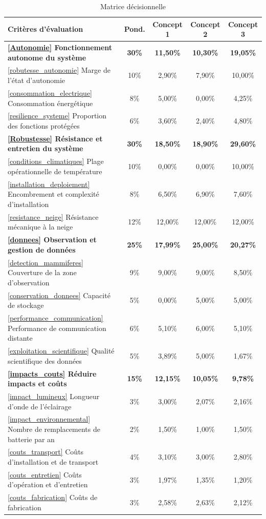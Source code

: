 \begin{table}[H]
\centering
\caption{Matrice décisionnelle}
\label{tab:matricede}
\small
\begin{tabular}{|l|c||c|c|c|}
\hline
Critères d'évaluation & Pond. & Concept 1 & Concept 2 & Concept 3 \\
\hline\hline
\textbf{\ref{Autonomie} Fonctionnement autonome du système} & \textbf{30\%} & \textbf{11,50\%} & \textbf{10,30\%} & \textbf{19,05\%}  \\
\hline
\ref{robutesse_autonomie} Marge de l'état d'autonomie & 10\% & 2,90\% & 7,90\% & 10,00\% \\
\ref{consommation_electrique} Consommation énergétique & 8\% & 5,00\% & 0,00\% & 4,25\% \\
\ref{resilience_systeme} Proportion des fonctions protégées & 6\% & 3,60\% & 2,40\% & 4,80\% \\
\hline

\textbf{\ref{Robustesse} Résistance et entretien du système} & \textbf{30\%} & \textbf{18,50\%} & \textbf{18,90\%} & \textbf{29,60\%}  \\
\hline
\ref{conditions_climatiques} Plage opérationnelle de température & 10\% & 0,00\% & 0,00\% & 10,00\% \\
\ref{installation_deploiement} Encombrement et complexité d'installation & 8\% & 6,50\% & 6,90\% & 7,60\% \\
\ref{resistance_neige} Résistance mécanique à la neige & 12\% & 12,00\% & 12,00\% & 12,00\% \\
\hline

\textbf{\ref{donnees} Observation et gestion de données} & \textbf{25\%} & \textbf{17,99\%} & \textbf{25,00\%} & \textbf{20,27\%}  \\
\hline
\ref{detection_mammiferes} Couverture de la zone d'observation & 9\% & 9,00\% & 9,00\% & 8,50\% \\
\ref{conservation_donnees} Capacité de stockage & 5\% & 0,00\% & 5,00\% & 5,00\% \\
\ref{performance_communication} Performance de communication distante & 6\% & 5,10\% & 6,00\% & 5,10\% \\
\ref{exploitation_scientifique} Qualité scientifique des données & 5\% & 3,89\% & 5,00\% & 1,67\% \\
\hline

\textbf{\ref{impacts_couts} Réduire impacts et coûts} & \textbf{15\%} & \textbf{12,15\%} & \textbf{10,05\%} & \textbf{9,78\%}  \\
\hline
\ref{impact_lumineux} Longueur d'onde de l'éclairage & 3\% & 3,00\% & 2,07\% & 2,16\% \\
\ref{impact_environnemental} Nombre de remplacements de batterie par an & 2\% & 1,50\% & 1,00\% & 1,50\% \\
\ref{couts_transport} Coûts d'installation et de transport & 4\% & 3,10\% & 3,00\% & 2,80\% \\
\ref{couts_entretien} Coûts d'opération et d'entretien & 3\% & 1,97\% & 1,35\% & 1,20\% \\
\ref{couts_fabrication} Coûts de fabrication & 3\% & 2,58\% & 2,63\% & 2,12\% \\
\hline\hline


\end{tabular}
\end{table}
